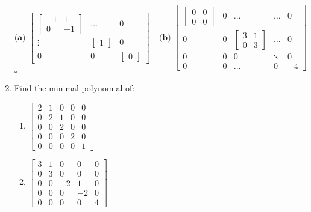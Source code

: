 \documentclass[10pt]{article}
\newenvironment{proof}{\noindent{\bf Proof.}}{\hfill $\square$\medskip}
\begin{document}
\begin{enumerate}
        \begin{proof}
        $$
        \textbf{(a) }\begin{bmatrix}
            \begin{bmatrix}
                -1&1\\
                0&-1
            \end{bmatrix}&\dots&0\\
                \vdots&
                \begin{bmatrix}
                    1
                \end{bmatrix}&0\\
                0&0&\begin{bmatrix}
                    0
                \end{bmatrix}
        \end{bmatrix}
        \quad\textbf{(b) }
        \begin{bmatrix}
            \begin{bmatrix}
                0&0\\
                0&0
            \end{bmatrix}&0&\dots&\dots&0\\
            0&0&\begin{bmatrix}
                3&1\\
                0&3
            \end{bmatrix}&\dots &0\\
            0 & 0 & 0 & \ddots & 0\\
            0 & 0 & \dots & 0 & -4
        \end{bmatrix}
        $$
        \end{proof}
        \item Find the minimal polynomial of:
        \begin{enumerate}[label=\textbf{(\alph*)}]
            \item $
            \begin{bmatrix}
                2&1&0&0&0\\
                0&2&1&0&0\\
                0&0&2&0&0\\
                0&0&0&2&0\\
                0&0&0&0&1
            \end{bmatrix}$
            \item 
            $\begin{bmatrix}
                3&1&0&0&0\\
                0&3&0&0&0\\
                0&0&-2&1&0\\
                0&0&0&-2&0\\
                0&0&0&0&4
            \end{bmatrix}$
        \end{enumerate}
        

\end{enumerate}
\end{document}
